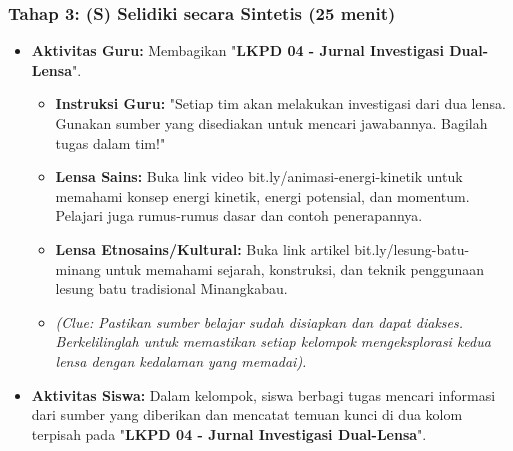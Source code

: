 \documentclass[a4paper,12pt]{article}
\begin{document}
\subsubsection{Tahap 3: (S) Selidiki secara Sintetis (25 menit)}
\begin{itemize}
\item \textbf{Aktivitas Guru:} Membagikan "\textbf{LKPD 04 - Jurnal Investigasi Dual-Lensa}".
    \begin{itemize}
    \item \textbf{Instruksi Guru:} "Setiap tim akan melakukan investigasi dari dua lensa. Gunakan sumber yang disediakan untuk mencari jawabannya. Bagilah tugas dalam tim!"
    \item \textbf{Lensa Sains:} Buka link video bit.ly/animasi-energi-kinetik untuk memahami konsep energi kinetik, energi potensial, dan momentum. Pelajari juga rumus-rumus dasar dan contoh penerapannya.
    \item \textbf{Lensa Etnosains/Kultural:} Buka link artikel bit.ly/lesung-batu-minang untuk memahami sejarah, konstruksi, dan teknik penggunaan lesung batu tradisional Minangkabau.
    \item \textit{(Clue: Pastikan sumber belajar sudah disiapkan dan dapat diakses. Berkelilinglah untuk memastikan setiap kelompok mengeksplorasi kedua lensa dengan kedalaman yang memadai).}
    \end{itemize}
\item \textbf{Aktivitas Siswa:} Dalam kelompok, siswa berbagi tugas mencari informasi dari sumber yang diberikan dan mencatat temuan kunci di dua kolom terpisah pada "\textbf{LKPD 04 - Jurnal Investigasi Dual-Lensa}".
\end{itemize}
\end{document}
